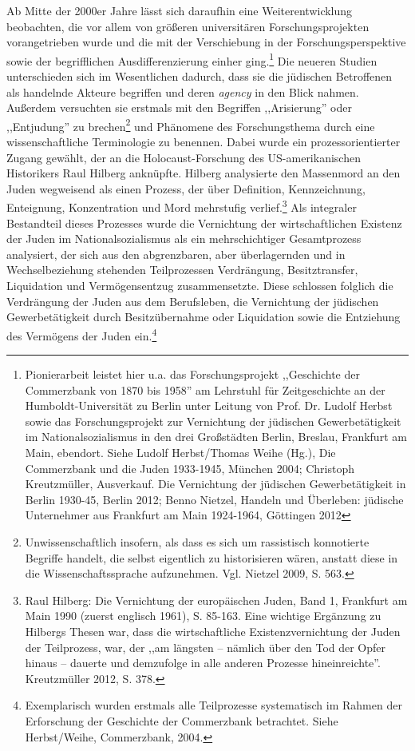 Ab Mitte der 2000er Jahre lässt sich daraufhin eine Weiterentwicklung beobachten, die vor allem von größeren universitären Forschungsprojekten vorangetrieben wurde und die mit der Verschiebung in der Forschungsperspektive sowie der begrifflichen Ausdifferenzierung einher ging.\footnote{Pionierarbeit leistet hier u.a. das Forschungsprojekt ,,Geschichte der Commerzbank von 1870 bis 1958'' am Lehrstuhl für Zeitgeschichte an der Humboldt-Universität zu Berlin unter Leitung von Prof. Dr. Ludolf Herbst sowie das Forschungsprojekt zur Vernichtung der jüdischen Gewerbetätigkeit im Nationalsozialismus in den drei Großstädten Berlin, Breslau, Frankfurt am Main, ebendort. Siehe Ludolf Herbst/Thomas Weihe (Hg.), Die Commerzbank und die Juden 1933-1945, München 2004; Christoph Kreutzmüller, Ausverkauf. Die Vernichtung der jüdischen Gewerbetätigkeit in Berlin 1930-45, Berlin 2012; Benno Nietzel, Handeln und Überleben: jüdische Unternehmer aus Frankfurt am Main 1924-1964, Göttingen 2012} Die neueren Studien unterschieden sich im Wesentlichen dadurch, dass sie die jüdischen Betroffenen als handelnde Akteure begriffen und deren \textit{agency} in den Blick nahmen. Außerdem versuchten sie erstmals mit den Begriffen ,,Arisierung'' oder ,,Entjudung'' zu brechen\footnote{Unwissenschaftlich insofern, als dass es sich um rassistisch konnotierte Begriffe handelt, die selbst eigentlich zu historisieren wären, anstatt diese in die Wissenschaftssprache aufzunehmen. Vgl. Nietzel 2009, S. 563.} und Phänomene des Forschungsthema durch eine wissenschaftliche Terminologie zu benennen. Dabei wurde ein prozessorientierter Zugang gewählt, der an die Holocaust-Forschung des US-amerikanischen Historikers Raul Hilberg anknüpfte. Hilberg analysierte den Massenmord an den Juden wegweisend als einen Prozess, der über Definition, Kennzeichnung, Enteignung, Konzentration und Mord mehrstufig verlief.\footnote{Raul Hilberg: Die Vernichtung der europäischen Juden, Band 1, Frankfurt am Main 1990 (zuerst englisch 1961), S. 85-163. Eine wichtige Ergänzung zu Hilbergs Thesen war, dass die wirtschaftliche Existenzvernichtung der Juden der Teilprozess, war, der ,,am längsten – nämlich über den Tod der Opfer hinaus – dauerte und demzufolge in alle anderen Prozesse hineinreichte''. Kreutzmüller 2012, S. 378.} Als integraler Bestandteil dieses Prozesses wurde die Vernichtung der wirtschaftlichen Existenz der Juden im Nationalsozialismus als ein mehrschichtiger Gesamtprozess analysiert, der sich aus den abgrenzbaren, aber überlagernden und in Wechselbeziehung stehenden Teilprozessen Verdrängung, Besitztransfer, Liquidation und Vermögensentzug zusammensetzte. Diese schlossen folglich die Verdrängung der Juden aus dem Berufsleben, die Vernichtung der jüdischen Gewerbetätigkeit durch Besitzübernahme oder Liquidation sowie die Entziehung des Vermögens der Juden ein.\footnote{Exemplarisch wurden erstmals alle Teilprozesse systematisch im Rahmen der Erforschung der Geschichte der Commerzbank betrachtet. Siehe Herbst/Weihe, Commerzbank, 2004.}

